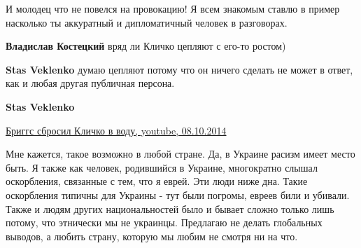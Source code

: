 \begin{itemize}
И молодец что не повелся на провокацию! Я всем знакомым ставлю в пример
насколько ты аккуратный и дипломатичный человек в разговорах.

\begin{itemize}
 
\textbf{Владислав Костецкий} вряд ли Кличко цепляют с его-то ростом)

 
\textbf{Stas Veklenko} думаю цепляют потому что он ничего сделать не может в ответ, как и любая другая публичная персона.

 
\textbf{Stas Veklenko} 

\href{https://www.youtube.com/watch?v=DhKHhi2aJBI}{%
Бриггс сбросил Кличко в воду, youtube, 08.10.2014%
}
\end{itemize}


Мне кажется, такое возможно в любой стране. Да, в Украине расизм имеет место
быть. Я также как человек, родившийся в Украине, многократно слышал
оскорбления, связанные с тем, что я еврей. Эти люди ниже дна. Такие оскорбления
типичны для Украины - тут были погромы, евреев били и убивали. Также и людям
других национальностей было и бывает сложно только лишь потому, что этнически
мы не украинцы. Предлагаю не делать глобальных выводов, а любить страну,
которую мы любим не смотря ни на что.

\begin{itemize}
 

\end{itemize}
\end{itemize}
